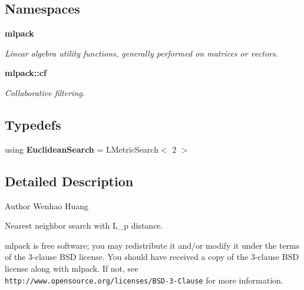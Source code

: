 \subsection*{Namespaces}
\begin{DoxyCompactItemize}
\item 
 \textbf{ mlpack}
\begin{DoxyCompactList}\small\item\em Linear algebra utility functions, generally performed on matrices or vectors. \end{DoxyCompactList}\item 
 \textbf{ mlpack\+::cf}
\begin{DoxyCompactList}\small\item\em Collaborative filtering. \end{DoxyCompactList}\end{DoxyCompactItemize}
\subsection*{Typedefs}
\begin{DoxyCompactItemize}
\item 
using \textbf{ Euclidean\+Search} = L\+Metric\+Search$<$ 2 $>$
\end{DoxyCompactItemize}


\subsection{Detailed Description}
\begin{DoxyAuthor}{Author}
Wenhao Huang
\end{DoxyAuthor}
Nearest neighbor search with L\+\_\+p distance.

mlpack is free software; you may redistribute it and/or modify it under the terms of the 3-\/clause B\+SD license. You should have received a copy of the 3-\/clause B\+SD license along with mlpack. If not, see {\tt http\+://www.\+opensource.\+org/licenses/\+B\+S\+D-\/3-\/\+Clause} for more information. 